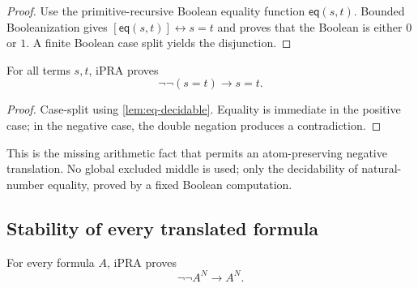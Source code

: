\begin{proof}
Use the primitive-recursive Boolean equality function \(\mathsf{eq}(s,t)\).  Bounded Booleanization gives
\(
 [\mathsf{eq}(s,t)]\leftrightarrow s=t
\)
and proves that the Boolean is either \(0\) or \(1\).  A finite Boolean case split yields the disjunction.
\end{proof}

\begin{corollary}
\label{cor:eq-stability}
For all terms \(s,t\), iPRA proves
\[
  \neg\neg(s=t)\to s=t.
\]
\end{corollary}

\begin{proof}
Case-split using \cref{lem:eq-decidable}.  Equality is immediate in the positive case; in the negative case, the double negation produces a contradiction.
\end{proof}

This is the missing arithmetic fact that permits an atom-preserving negative translation.  No global excluded middle is used; only the decidability of natural-number equality, proved by a fixed Boolean computation.

\subsection{Stability of every translated formula}

\begin{theorem}
\label{thm:negative-stability}
For every formula \(A\), iPRA proves
\[
  \neg\neg A^N\to A^N.
\]
\end{theorem}

